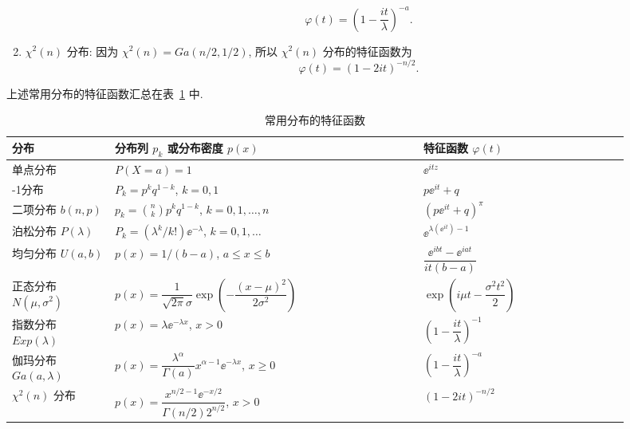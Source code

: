 \begin{example}
\begin{enumerate}
        \begin{equation*}
            \varphi(t) = \left( 1 - \frac{it}{\lambda} \right)^{-a}.
        \end{equation*}
        \item
        $ \chi^2 (n) $ {\heiti 分布}: 因为 $ \chi^2 (n) = Ga ( n/2, 1/2 ) $, 所以 $ \chi^2 (n) $ 分布的特征函数为
        \begin{equation*}
            \varphi (t) = ( 1 - 2it )^{-n/2}.
        \end{equation*}
    \end{enumerate}
\end{example}

上述常用分布的特征函数汇总在表~\ref{tab:4.1.1} 中.

\begin{table}
    \renewcommand{\arraystretch}{1.6}
    \centering
    \caption{常用分布的特征函数}\label{tab:4.1.1}
    \begin{tabular}{>{\centering\arraybackslash}m{0.15\linewidth}>{\centering\arraybackslash}m{0.45\linewidth}>{\centering\arraybackslash}m{0.3\linewidth}}
        \toprule
        分布 & 分布列 $ p_k $ 或分布密度 $ p (x) $ & 特征函数 $ \varphi (t) $\\
        \midrule
        单点分布 & $ P (X = a) = 1 $ & $ \ee^{itz} $\\
        0-1分布 & $ P_k = p^k  q^{1 - k} $, $ k = 0,1 $ & $ p \ee^{it} + q $\\
        二项分布 $ b (n, p) $ & $ p_k = \binom{n}{k} p^k q^{1-k} $, $ k = 0,1,\dotsc,n $ & $ \left( p \ee^{it} + q \right)^{\pi} $\\
        泊松分布 $ P (\lambda) $ & $ P_k = ( \lambda^k/k! ) \ee^{-\lambda} $, $ k = 0, 1, \dotsc $ & $ \ee^{\lambda ( \ee^{it} ) -1} $\\
        均匀分布 $ U (a,b) $ & $ p (x) = 1/(b-a) $, $ a \leq x \leq b $ & $ \dfrac{\ee^{ibt} - \ee^{iat}}{it (b-a)} $\\
        正态分布 $ N (\mu, \sigma^2) $ & $ p (x) = \dfrac{1}{\sqrt{2\pi}\sigma} \exp \left( - \dfrac{( x - \mu )^2}{2 \sigma^2} \right) $ & $ \exp \left( i \mu t - \dfrac{\sigma^2 t^2}{2} \right) $\\
        指数分布 $ Exp ( \lambda ) $ & $ p (x) = \lambda \ee^{-\lambda x} $, $ x > 0 $ & $ \left( 1 - \dfrac{it}{\lambda} \right)^{-1} $\\
        伽玛分布 $ Ga ( a, \lambda ) $ & $ p (x) = \dfrac{\lambda^\alpha}{\Gamma (a)} x^{\alpha - 1} \ee^{-\lambda x} $, $ x \geq 0 $ & $ \left( 1 - \dfrac{it}{\lambda} \right)^{-a} $\\
        $ \chi^2 (n) $ 分布 & $ p (x) = \dfrac{x^{n/2 - 1} \ee^{-x/2}}{\Gamma (n/2) 2^{n/2}} $, $ x > 0 $ & $ ( 1 - 2it )^{-n/2} $\\
        \bottomrule
    \end{tabular}
\end{table}

